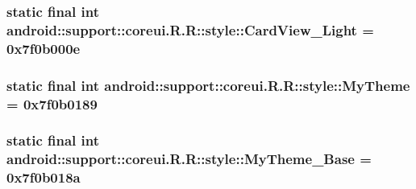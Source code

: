 \hypertarget{classandroid_1_1support_1_1coreui_1_1_r_1_1style_b663dc01d01bd54b75b5bc5584bc24ce}{
\subsubsection[{CardView\_\-Light}]{\setlength{\rightskip}{0pt plus 5cm}static final int android::support::coreui.R.R::style::CardView\_\-Light = 0x7f0b000e}}
\label{classandroid_1_1support_1_1coreui_1_1_r_1_1style_b663dc01d01bd54b75b5bc5584bc24ce}


\hypertarget{classandroid_1_1support_1_1coreui_1_1_r_1_1style_bd17d9183bb581f2822f54eb58869eff}{
\subsubsection[{MyTheme}]{\setlength{\rightskip}{0pt plus 5cm}static final int android::support::coreui.R.R::style::MyTheme = 0x7f0b0189}}
\label{classandroid_1_1support_1_1coreui_1_1_r_1_1style_bd17d9183bb581f2822f54eb58869eff}


\hypertarget{classandroid_1_1support_1_1coreui_1_1_r_1_1style_ae6347d4b1dc8f9e87a28c581d52ef0d}{
\subsubsection[{MyTheme\_\-Base}]{\setlength{\rightskip}{0pt plus 5cm}static final int android::support::coreui.R.R::style::MyTheme\_\-Base = 0x7f0b018a}}
\label{classandroid_1_1support_1_1coreui_1_1_r_1_1style_ae6347d4b1dc8f9e87a28c581d52ef0d}


